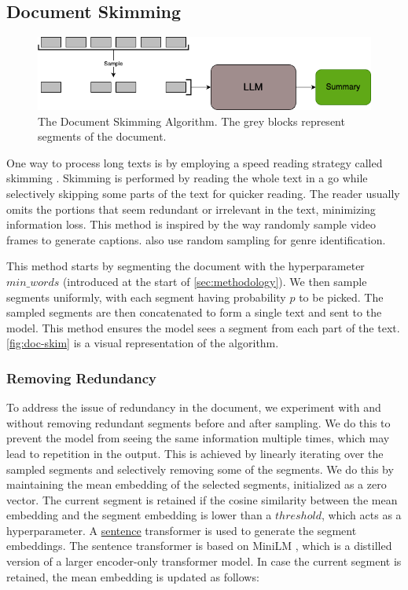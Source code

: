 	\subsection{Document Skimming}
		\label{method:skimming}

		\begin{figure}[!ht]
			\centering
			\includegraphics[width=.8\textwidth]{Images/doc-skim.png}
			\caption{The Document Skimming Algorithm. The grey blocks represent segments of the document.}
			\label{fig:doc-skim}
		\end{figure}

		One way to process long texts is by employing a speed reading strategy called skimming
		\cite{dhillon2020effect}.
		Skimming is performed by reading the whole text in a go while selectively skipping some parts
		of the text for quicker reading.
		The reader usually omits the portions that seem redundant or irrelevant in the text, minimizing
		information loss.
		This method is inspired by the way \citet{wang2024videoagent} randomly sample video frames to
		generate captions.
		\citet{worsham-kalita-2018-genre} also use random sampling for genre identification.

		This method starts by segmenting the document with the hyperparameter $min\_words$ (introduced
		at the start of \autoref{sec:methodology}).
		We then sample segments uniformly, with each segment having probability $p$ to be picked.
		The sampled segments are then concatenated to form a single text and sent to the model.
		This method ensures the model sees a segment from each part of the text.
		\autoref{fig:doc-skim} is a visual representation of the algorithm.

		\subsubsection*{Removing Redundancy}

			To address the issue of redundancy in the document, we experiment with and without removing
			redundant segments before and after sampling.
			We do this to prevent the model from seeing the same information multiple times, which may
			lead to repetition in the output.
			This is achieved by linearly iterating over the sampled segments and selectively removing some
			of the segments.
			We do this by maintaining the mean embedding of the selected segments, initialized as a zero
			vector.
			The current segment is retained if the cosine similarity between the mean embedding and the
			segment embedding is lower than a $threshold$, which acts as a hyperparameter.
			A \href{https://huggingface.co/sentence-transformers/all-MiniLM-L6-v2}{sentence} transformer
			is used to generate the segment embeddings.
			The sentence transformer is based on MiniLM \cite{wang2020minilm}, which is a distilled version
			of a larger encoder-only transformer model.
			In case the current segment is retained, the mean embedding is updated as follows:

